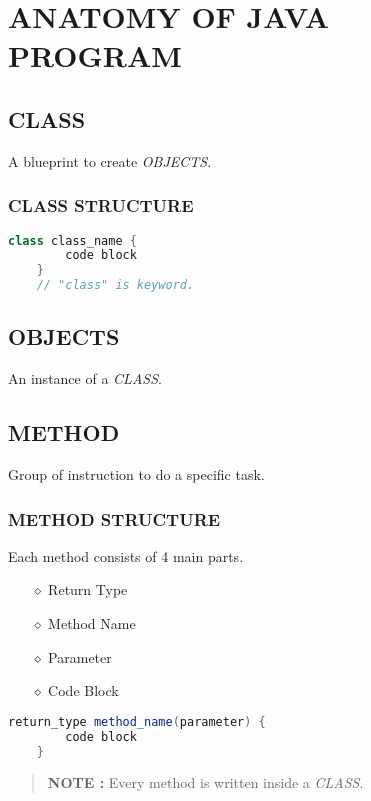 \section{ANATOMY OF JAVA PROGRAM}

\subsection{CLASS}
A blueprint to create \textsl{OBJECTS}.

\subsubsection{CLASS STRUCTURE}
\begin{lstlisting}[language=java]
	class class_name {
		code block
	}
	// "class" is keyword.
\end{lstlisting}

\subsection{OBJECTS}
An instance of a \textsl{CLASS}.

\subsection{METHOD}
Group of instruction to do a specific task.

\subsubsection{METHOD STRUCTURE}
Each method consists of 4 main parts.
\begin{itemize}
	\item[{\LARGE $\diamond$}] Return Type
	\item[{\LARGE $\diamond$}] Method Name
	\item[{\LARGE $\diamond$}]Parameter
	\item[{\LARGE $\diamond$}]Code Block
\end{itemize}

\begin{lstlisting}[language=java]
	return_type method_name(parameter) {
		code block
	}
\end{lstlisting}

\begin{quotation}
	\textbf{NOTE :} Every method is written inside a \textsl{CLASS}.
\end{quotation}

